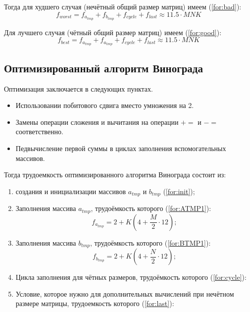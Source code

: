Тогда для худшего случая (нечётный общий размер матриц) имеем (\ref{for:bad}):
\begin{equation}
	\label{for:bad}
	f_{worst} =  f_{a_{tmp}} + f_{b_{tmp}} + f_{cycle} + f_{last}\approx 11.5 \cdot MNK
\end{equation}

Для лучшего случая (чётный общий размер матриц) имеем (\ref{for:good}):
\begin{equation}
	\label{for:good}
	f_{best} =  f_{a_{tmp}} + f_{a_{tmp}} + f_{cycle} + f_{last} \approx 11.5 \cdot MNK
\end{equation}


\subsection{Оптимизированный алгоритм Винограда}

Оптимизация заключается в следующих пунктах.
\begin{itemize}
	\item Использовании побитового сдвига вместо умножения на 2.
	\item Замены операции сложения и вычитания на операции $+=$ и $-=$ соответственно.
	\item Педвычисление первой суммы в циклах заполнения вспомогательных массивов.
\end{itemize}

Тогда трудоемкость оптимизированного алгоритма Винограда состоит из:

\begin{enumerate}
	\item создания и инициализации массивов $a_{tmp}$ и $b_{tmp}$ (\ref{for:init});
	
	\item Заполнения массива $a_{tmp}$, трудоёмкость которого (\ref{for:ATMP1}):
\begin{equation}
		\label{for:ATMP1}
f_{a_{tmp}} = 2 + K (4 + \frac{M}{2} \cdot 12);
\end{equation}

\item Заполнения массива $b_{tmp}$, трудоёмкость которого (\ref{for:BTMP1}):
\begin{equation}
\label{for:BTMP1}
f_{b_{tmp}} = 2 + K (4 + \frac{N}{2} \cdot 12);
\end{equation}
	\newline
	\item Цикла заполнения для чётных размеров, трудоёмкость которого (\ref{for:cycle}):
	
	\item Условие, которое нужно для дополнительных вычислений при нечётном размере матрицы, трудоемкость которого (\ref{for:last}):

\end{enumerate}

